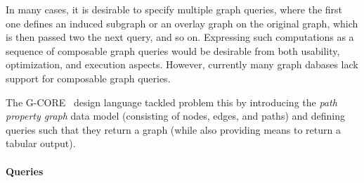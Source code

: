 
In many cases, it is desirable to specify multiple graph queries, where the first one defines an induced subgraph or an overlay graph on the original graph, which is then passed two the next query, and so on.
Expressing such computations as a sequence of composable graph queries would be desirable from both usability, optimization, and execution aspects. However, currently many graph dabases lack support for composable graph queries.

The \mbox{G-CORE}~\cite{DBLP:conf/sigmod/AnglesABBFGLPPS18} design language tackled problem this by introducing the \emph{path property graph} data model (consisting of nodes, edges, and paths) and defining queries such that they return a graph (while also providing means to return a tabular output).


\paragraph{Queries}
{\raggedright

}